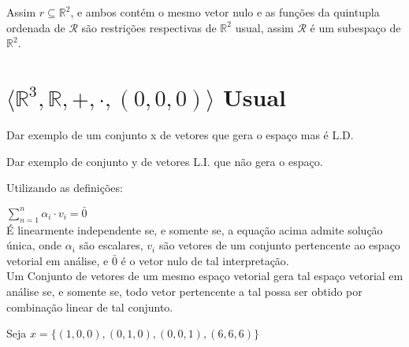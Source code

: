 \documentclass[12pt, twoside, a4]{article} %
\begin{document}
Assim $ r \subseteq \mathbb{R}^2 $, e ambos contém o mesmo vetor nulo e as funções da quintupla ordenada de $\mathcal{R} $ são restrições respectivas de $ \mathbb{R}^2 $ usual, 
assim $ \mathcal{R} $ é um subespaço de $ \mathbb{R}^2 $.


\section{$ \langle \mathbb{R}^3, \mathbb{R}, +, \cdot, (0, 0, 0)\rangle  $ Usual} 
\begin{itemize} 
    \begin{bf}
        \item Dar exemplo de um conjunto x de vetores que gera o espaço mas é L.D.
        \item Dar exemplo de conjunto y de vetores L.I. que não gera o espaço.
    \end{bf}
\end{itemize}
Utilizando as definições:
\begin{center}

        
        $\sum\limits_{n = 1}^{n} \alpha_i \cdot v_i = \bar{0}$  
        \\
        É linearmente independente se, e somente se, a equação acima admite solução única, onde $\alpha_i$ são escalares, $v_i $ são vetores de um conjunto pertencente ao espaço vetorial em análise, e $\bar{0}$ é o vetor nulo de tal interpretação.  
        \vspace{0.5cm}
        \\
        Um Conjunto de vetores de um mesmo espaço vetorial gera tal espaço vetorial em análise se, e somente se, todo vetor pertencente a tal possa ser obtido por combinação linear de tal conjunto.
        \\

\end{center}
\noindent
Seja $x = \{(1,0,0), (0,1,0), (0,0,1), (6,6,6)\}$
\vspace{-0.3cm}
\end{document}
